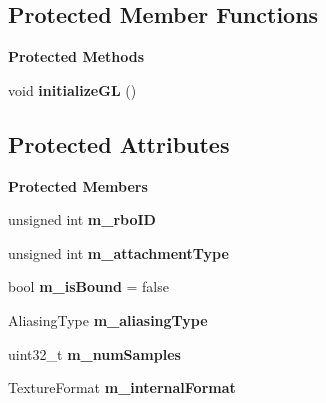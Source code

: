 \subsection*{Protected Member Functions}
\begin{Indent}\textbf{ Protected Methods}\par
\begin{DoxyCompactItemize}
\item 
\mbox{\label{classrev_1_1_render_buffer_object_a584bb78c33cc739b80d6063075aa0b0e}} 
void {\bfseries initialize\+GL} ()
\end{DoxyCompactItemize}
\end{Indent}
\subsection*{Protected Attributes}
\begin{Indent}\textbf{ Protected Members}\par
\begin{DoxyCompactItemize}
\item 
\mbox{\label{classrev_1_1_render_buffer_object_ac8c78940a8ed0ae26b610c2e08213c30}} 
unsigned int {\bfseries m\+\_\+rbo\+ID}
\item 
\mbox{\label{classrev_1_1_render_buffer_object_ae20173406fe8fb6a16cc75371f8efad4}} 
unsigned int {\bfseries m\+\_\+attachment\+Type}
\item 
\mbox{\label{classrev_1_1_render_buffer_object_a096cf855daa81af9569563be1e9147bd}} 
bool {\bfseries m\+\_\+is\+Bound} = false
\item 
\mbox{\label{classrev_1_1_render_buffer_object_ae9c355794cf45dfc039ff80c02a12ace}} 
Aliasing\+Type {\bfseries m\+\_\+aliasing\+Type}
\item 
\mbox{\label{classrev_1_1_render_buffer_object_aa206473e0d09937c6ab7dc68e10d562c}} 
uint32\+\_\+t {\bfseries m\+\_\+num\+Samples}
\item 
\mbox{\label{classrev_1_1_render_buffer_object_a5bb130eea7266401fb3148846b3fd41b}} 
Texture\+Format {\bfseries m\+\_\+internal\+Format}
\end{DoxyCompactItemize}
\end{Indent}
